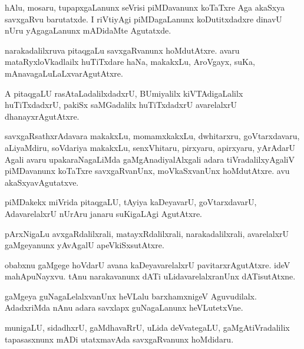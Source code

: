 \documentclass{article}
\begin{document}
\begin{mng}%
hAlu, mosaru, tupapxgaLanunx seVrisi piMDavanunx koTaTxre Aga akaSxya savxgaRvu barutatxde. I riVtiyAgi piMDagaLanunx koDutitxdadxre dinavU nUru yAgagaLanunx mADidaMte Agutatxde.
\end{mng}

\begin{mng}%
narakadalilxruva pitaqgaLu savxgaRvanunx hoMdutAtxre. avaru mataRyxloVkadlailx huTiTxdare haNa, makakxLu, AroVgayx, suKa, mAnavagaLuLaLxvarAgutAtxre.
\end{mng}

\begin{mng}%
A pitaqgaLU rasAtaLadalilxdadxrU, BUmiyalilx kiVTAdigaLalilx huTiTxdadxrU, pakiSx saMGadalilx huTiTxdadxrU avarelalxrU dhanayxrAgutAtxre.
\end{mng}

\begin{mng}%
savxgaRsathxrAdavara makakxLu, momamxkakxLu, dwhitarxru, goVtarxdavaru, aLiyaMdiru, soVdariya makakxLu, senxVhitaru, pirxyaru, apirxyaru, yArAdarU Agali avaru upakaraNagaLiMda gaMgAnadiyalAlxgali adara tiVradalilxyAgaliV piMDavanunx koTaTxre savxgaRvanUnx, moVkaSxvanUnx hoMdutAtxre. avu akaSxyavAgutatxve.
\end{mng}

\begin{mng}%
piMDakekx miVrida pitaqgaLU, tAyiya kaDeyavarU, goVtarxdavarU, AdavarelalxrU nUrAru janaru suKigaLAgi AgutAtxre.
\end{mng}

\begin{mng}%
pArxNigaLu avxgaRdalilxrali, matayxRdalilxrali, narakadalilxrali, avarelalxrU gaMgeyanunx yAvAgalU apeVkiSxsutAtxre.
\end{mng}

\begin{mng}%
obabxnu gaMgege hoVdarU avana kaDeyavarelalxrU pavitarxrAgutAtxre. ideV mahApuNayxvu. tAnu narakavanunx dATi uLidavarelalxranUnx dATisutAtxne.
\end{mng}

\begin{mng}%
gaMgeya guNagaLelalxvanUnx heVLalu barxhamxnigeV Aguvudilalx. AdadxriMda nAnu adara savxlapx guNagaLanunx heVLutetxVne.
\end{mng}

\begin{mng}%
munigaLU, sidadhxrU, gaMdhavaRrU, uLida deVvategaLU, gaMgAtiVradalilix tapasasxnunx mADi utatxmavAda savxgaRvanunx hoMdidaru.
\end{mng}
\end{document}
